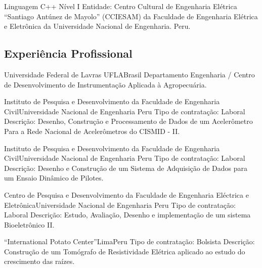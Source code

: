 \documentclass[11pt,a4paper,sans]{moderncv} %
\begin{document}
	      {Linguagem C++ }{ Nível I}{}
	      {Entidade: Centro Cultural de Engenharia Elétrica ``Santiago 
	      Antúnez de Mayolo'' (CCIESAM) da Faculdade de Engenharia Elétrica 
	      e Eletrônica da Universidade Nacional de Engenharia. Peru.}

\subsection{Experiência Profissional}


	      {Universidade Federal de Lavras}
	      {UFLA}{Brasil}
	      {Departamento Engenharia / Centro de Desenvolvimento de Instrumentação Aplicada à Agropecuária. }


		      {Instituto de Pesquisa e Desenvolvimento da Faculdade 
		      de Engenharia Civil}{Universidade Nacional de Engenharia }{Peru}
		      {Tipo de contratação: Laboral\newline{}
		      Descrição: Desenho, Construção e Processamento de Dados de um 
		      Acelerômetro Para a Rede Nacional de Acelerômetros do CISMID - II.}

		      {Instituto de Pesquisa e Desenvolvimento da Faculdade 
		      de Engenharia Civil}{Universidade Nacional de Engenharia }{Peru}
		      {Tipo de contratação: Laboral\newline{}
		      Descrição: Desenho e  Construção  de  um  Sistema  de  
		      Adquisição  de  Dados para  um  Ensaio  Dinâmico  de  Pilotes.}

		      {Centro de Pesquisa e Desenvolvimento da Faculdade de 
		      Engenharia Eléctrica e Eletrônica}{Universidade Nacional de Engenharia }{Peru}
		      {Tipo de contratação: Laboral\newline{}
		      Descrição: Estudo, Avaliação, Desenho e implementação de um sistema Bioeletrônico II.}

		      {``International Potato Center''}{Lima}{Peru}
		      {Tipo de contratação: Bolsista\newline{}
		      Descrição: Construção  de  um  Tomógrafo  de  Resistividade 
		      Elétrica  aplicado ao  estudo  do  crescimento  das  raízes.}
\end{document}
